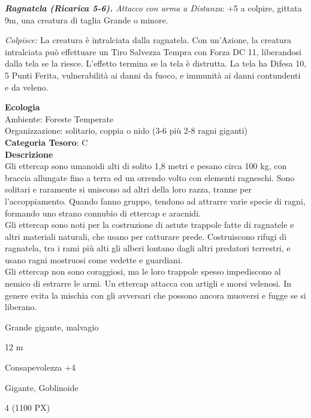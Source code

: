 \begin{multicols}{2}
{\emph{\textbf{Ragnatela (Ricarica 5-6).} Attacco con arma a Distanza}: +5 a colpire, gittata 9m, una creatura di taglia Grande o minore.

\emph{Colpisce:} La creatura è intralciata dalla ragnatela. Con un'Azione, la creatura intralciata può effettuare un Tiro Salvezza Tempra con Forza DC 11, liberandosi dalla tela se la riesce. L'effetto termina se la tela è distrutta. La tela ha Difesa 10, 5 Punti Ferita, vulnerabilità ai danni da fuoco, e immunità ai danni contundenti e da veleno.

\textbf{Ecologia}\\
Ambiente: Foreste Temperate\\
Organizzazione: solitario, coppia o nido (3-6 più 2-8 ragni giganti)\\
\textbf{Categoria Tesoro}: C\\
\textbf{Descrizione}\\
Gli ettercap sono umanoidi alti di solito 1,8 metri e pesano circa 100 kg, con braccia allungate fino a terra ed un orrendo volto con elementi ragneschi. Sono solitari e raramente si uniscono ad altri della loro razza, tranne per l'accoppiamento. Quando fanno gruppo, tendono ad attrarre varie specie di ragni, formando uno strano connubio di ettercap e aracnidi.\\
Gli ettercap sono noti per la costruzione di astute trappole fatte di ragnatele e altri materiali naturali, che usano per catturare prede. Costruiscono rifugi di ragnatela, tra i rami più alti gli alberi lontano dagli altri predatori terrestri, e usano ragni mostruosi come vedette e guardiani.\\
Gli ettercap non sono coraggiosi, ma le loro trappole spesso impediscono al nemico di estrarre le armi. Un ettercap attacca con artigli e morsi velenosi. In genere evita la mischia con gli avversari che possono ancora muoversi e fugge se si liberano.

\begin{description}[noitemsep, topsep=0pt, parsep=0pt, partopsep=0pt, itemsep=1pt, leftmargin=2.35cm,  labelwidth=2.2cm, itemindent=0cm, listparindent=0pt] %
\setlength{\baselineskip}{10pt}
\item[\textbf{Taglia/Tipo}] Grande gigante, malvagio
\item[\textbf{Caratt.}] 
\item[\textbf{Punti Ferita}] 
\item[\textbf{Movimento}] 12 m
\item[\textbf{Tiri Salvez.}] 
\item[\textbf{Comp.}] Consapevolezza +4
\item[\textbf{Sensi}] 
\item[\textbf{Linguaggi}] Gigante, Goblinoide
\item[\textbf{Sfida}] 4 (1100 PX)
\end{description}
\smallskip

}
\end{multicols}
